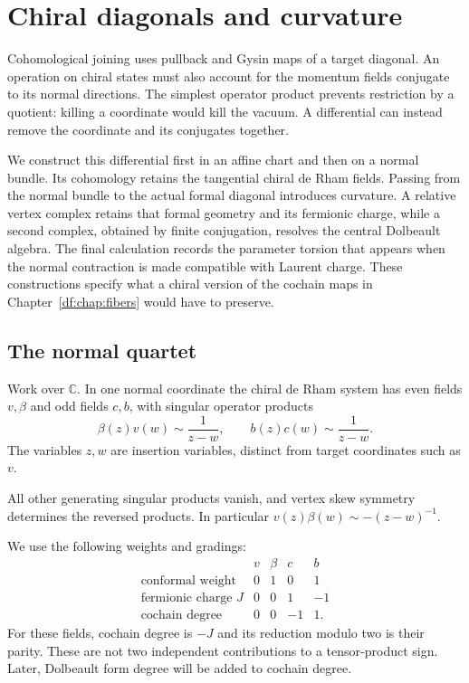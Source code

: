 \chapter{Chiral diagonals and curvature}
\label{nd:chap:diagonal}

Cohomological joining uses pullback and Gysin maps of a target diagonal.
An operation on chiral states must also account for the momentum fields
conjugate to its normal directions. The simplest operator
product prevents restriction by a quotient: killing a coordinate would
kill the vacuum. A differential can instead remove the coordinate and
its conjugates together.

We construct this differential first in an affine chart and then on a
normal bundle. Its cohomology retains the tangential chiral de Rham
fields. Passing from the normal bundle to the actual formal diagonal
introduces curvature. A relative vertex complex retains that formal
geometry and its fermionic charge, while a second complex, obtained by
finite conjugation, resolves the central Dolbeault algebra. The final
calculation records the parameter torsion that appears when the normal
contraction is made compatible with Laurent charge. These constructions
specify what a chiral version of the cochain maps in
Chapter~\ref{df:chap:fibers} would have to preserve.

\section{The normal quartet}
\label{nd:sec:quartet}

Work over $\mathbb C$. In one normal coordinate the chiral de Rham
system has even fields $v,\beta$ and odd fields $c,b$, with singular
operator products
\begin{equation}\label{nd:eq:ope}
 \beta(z)v(w)\sim\frac1{z-w},\qquad
 b(z)c(w)\sim\frac1{z-w}.
\end{equation}
The variables $z,w$ are insertion variables, distinct from target
coordinates such as $v$.

All other generating singular products vanish,
and vertex skew symmetry determines the reversed products. In
particular $v(z)\beta(w)\sim-(z-w)^{-1}$.

We use the following weights and gradings:
\[
\begin{array}{c|rrrr}
 &v&\beta&c&b\\\hline
 \text{conformal weight}&0&1&0&1\\
 \text{fermionic charge }J&0&0&1&-1\\
 \text{cochain degree}&0&0&-1&1.
\end{array}
\]
For these fields, cochain degree is $-J$ and its reduction modulo two
is their parity. These are not two independent contributions to a
tensor-product sign. Later, Dolbeault form degree will be added to
cochain degree.

